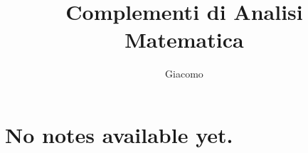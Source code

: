 \documentclass{article}
\title{Complementi di Analisi Matematica}
\author{Giacomo}
\begin{document}
\maketitle

\section*{No notes available yet.}
\end{document}
